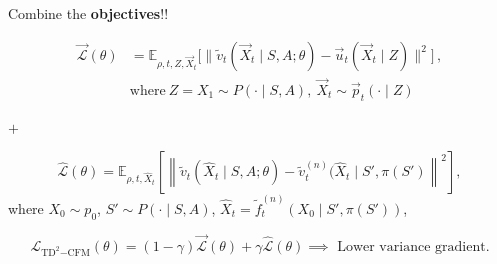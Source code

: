 \documentclass{beamer}
\begin{document}
    \begin{frame}
        Combine the \textbf{objectives}!!
\begin{blackblock}
\[ \begin{aligned} \vec{\mathcal{L}}(\theta) &= \mathbb{E}_{\rho,t,Z,\vec{X}_t}\Big[\big\|\tilde{v}_t(\vec{X}_t\mid S, A; \theta) - \vec{u}_{t}(\vec{X}_t\mid Z)\big\|^2\Big]\,,\\ &\text{where}\ Z = X_1 \sim P(\cdot\mid S, A),\ \vec{X}_t \sim \vec{p}_{t}(\cdot\mid Z)\, \end{aligned} \]
\end{blackblock}
\begin{center}
    \Large
    \( + \)
\end{center}
\begin{blackblock}
\[ \widehat{\mathcal{L}}(\theta) = \mathbb{E}_{\rho,t,\widehat{X}_t} \left[ \left\| \tilde{v}_t(\widehat{X}_t \mid S, A; \theta) - \tilde{v}_t^{(n)}(\widehat{X}_t \mid S', \pi(S') \right\|^2 \right], \]where $X_0 \sim p_0$, $S' \sim P(\cdot \mid S, A)$, $\widehat{X}_t = \widetilde{f}_t^{(n)}(X_0 \mid S', \pi(S'))$,
\end{blackblock}
\vspace*{.5cm}
\[
    \mathcal{L}_{\mathrm{TD}^2\mathrm{-CFM}}(\theta) = (1 - \gamma) \vec{\mathcal{L}}(\theta) + \gamma \widehat{\mathcal{L}}(\theta) \implies \text{ Lower variance gradient}
.\] 
\end{frame}
\end{document}

